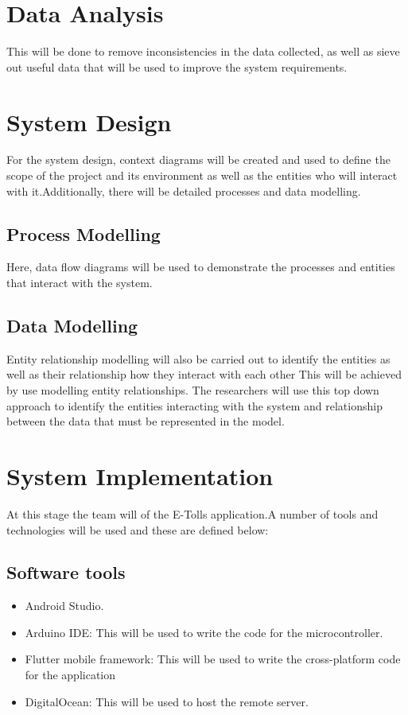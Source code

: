 \section{Data Analysis}
This will be done to remove inconsistencies in the data collected, as well as sieve out useful data that will be used to improve the system requirements.


\section{System Design}
For the system design, context diagrams will be created and used to define the scope of the project and its environment as well as the entities who will interact with it.Additionally, there will be detailed processes and data modelling\cite{rumbaugh_object-oriented_1991}.

\subsection{Process Modelling}
Here, data flow diagrams will be used to demonstrate the processes and entities that interact with the system.

\subsection{Data Modelling}
Entity relationship modelling will also be carried out to identify the entities as well as their relationship how they interact with each other
This will be achieved by use modelling entity relationships. The researchers will use this top down approach to identify the entities interacting with the system and relationship between the data that must be represented in the model.


\section{System Implementation}
At this stage the team will of the E-Tolls application.A number of tools and technologies will be used and these are defined below:

\subsection{Software tools}
\begin{itemize}
    \item  Android Studio.
    \item Arduino IDE: This will be used to write the code for the microcontroller.
    \item Flutter mobile framework: This will be used to write the cross-platform code for the application
    \item DigitalOcean: This will be used to host the remote server.
\end{itemize}

